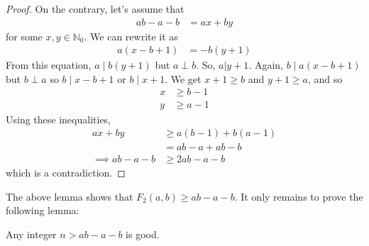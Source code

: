 \documentclass{subfile}
\begin{document}
	\begin{proof}
		On the contrary, let's assume that
			\begin{align*}
				ab-a-b & = ax+by
			\end{align*}
		for some $x,y\in\mathbb{N}_0$. We can rewrite it as
			\begin{align*}
				a(x-b+1) & = -b(y+1)
			\end{align*}
		From this equation, $a\mid b(y+1)$ but $a\perp b$. So, $a|y+1$. Again, $b\mid a(x-b+1)$ but $b\perp a$ so $b\mid x-b+1$ or $b\mid x+1$. We get $x+1\geq b$ and $y+1\geq a$, and so
			\begin{align*}
				 x
				 	& \geq b-1\\
				 y
				 	& \geq a-1
			\end{align*}
		Using these inequalities,
			\begin{align*}
				 ax+by
				 	& \geq a(b-1)+b(a-1) \\
					&= ab-a+ab-b\\
				\implies ab-a-b
					& \geq 2ab-a-b
			\end{align*}
		which is a contradiction.
	\end{proof}

%
%
%
The above lemma shows that $F_2(a,b) \geq ab-a-b$. It only remains to prove the following lemma:
	\begin{lemma}
		Any integer $n>ab-a-b$ is good.
	\end{lemma}
\end{document}
